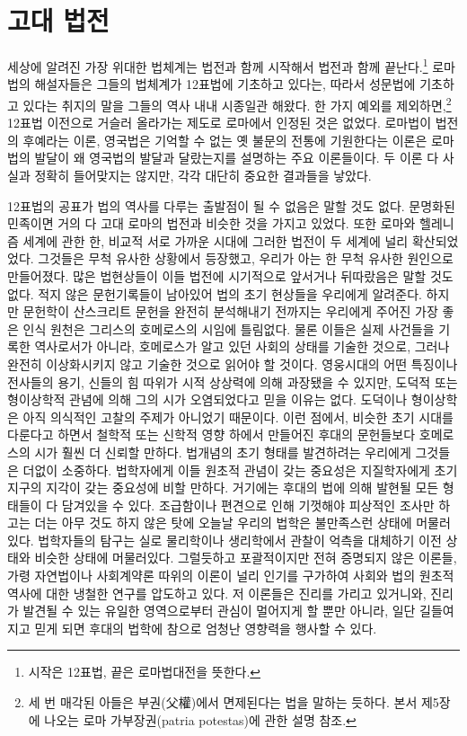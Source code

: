 
\chapter{고대 법전}

세상에 알려진 가장 위대한 법체계는 법전과 함께 시작해서
법전과 함께 끝난다.\footnote{시작은 12표법, 끝은 로마법대전을 뜻한다.}
로마법의 해설자들은 그들의 법체계가 12표법에 기초하고 있다는,
따라서 성문법에 기초하고 있다는 취지의 말을 그들의 역사 내내 시종일관 해왔다.
한 가지 예외를 제외하면,\footnote{세 번 매각된 아들은
부권(父權)에서 면제된다는 법을 말하는 듯하다.
본서 제5장에 나오는 로마 가부장권(patria potestas)에 관한 설명 참조.}
12표법 이전으로 거슬러 올라가는 제도로 로마에서 인정된 것은 없었다.
로마법이 법전의 후예라는 이론, 영국법은 기억할 수 없는
옛 불문의 전통에 기원한다는 이론은
로마법의 발달이 왜 영국법의 발달과 달랐는지를 설명하는 주요 이론들이다.
두 이론 다 사실과 정확히 들어맞지는 않지만, 각각 대단히 중요한 결과들을 낳았다.

12표법의 공표가 법의 역사를 다루는 출발점이 될 수 없음은 말할 것도 없다.
문명화된 민족이면 거의 다 고대 로마의 법전과 비슷한 것을 가지고 있었다.
또한 로마와 헬레니즘 세계에 관한 한, 비교적 서로 가까운 시대에
그러한 법전이 두 세계에 널리 확산되었었다.
그것들은 무척 유사한 상황에서 등장했고, 우리가 아는 한
무척 유사한 원인으로 만들어졌다.
많은 법현상들이 이들 법전에 시기적으로 앞서거나 뒤따랐음은 말할 것도 없다.
적지 않은 문헌기록들이 남아있어 법의 초기 현상들을 우리에게 알려준다.
하지만 문헌학이 산스크리트 문헌을 완전히 분석해내기 전까지는
우리에게 주어진 가장 좋은 인식 원천은 그리스의 호메로스의 시임에 틀림없다.
물론 이들은 실제 사건들을 기록한 역사로서가 아니라,
호메로스가 알고 있던 사회의 상태를 기술한 것으로,
그러나 완전히 이상화시키지 않고 기술한 것으로 읽어야 할 것이다.
영웅시대의 어떤 특징이나 전사들의 용기, 신들의 힘 따위가
시적 상상력에 의해 과장됐을 수 있지만, 도덕적 또는 형이상학적 관념에 의해
그의 시가 오염되었다고 믿을 이유는 없다.
도덕이나 형이상학은 아직 의식적인 고찰의 주제가 아니었기 때문이다.
이런 점에서, 비슷한 초기 시대를 다룬다고 하면서
철학적 또는 신학적 영향 하에서 만들어진 후대의 문헌들보다
호메로스의 시가 훨씬 더 신뢰할 만하다.
법개념의 초기 형태를 발견하려는 우리에게 그것들은 더없이 소중하다.
법학자에게 이들 원초적 관념이 갖는 중요성은
지질학자에게 초기 지구의 지각이 갖는 중요성에 비할 만하다.
거기에는 후대의 법에 의해 발현될 모든 형태들이 다 담겨있을 수 있다.
조급함이나 편견으로 인해 기껏해야 피상적인 조사만 하고는 더는
아무 것도 하지 않은 탓에 오늘날 우리의 법학은 불만족스런 상태에 머물러있다.
법학자들의 탐구는 실로 물리학이나 생리학에서 관찰이 억측을 대체하기 이전
상태와 비슷한 상태에 머물러있다.
그럴듯하고 포괄적이지만 전혀 증명되지 않은 이론들, 가령
자연법이나 사회계약론 따위의 이론이 널리 인기를 구가하여
사회와 법의 원초적 역사에 대한 냉철한 연구를 압도하고 있다.
저 이론들은 진리를 가리고 있거니와,
진리가 발견될 수 있는 유일한 영역으로부터 관심이 멀어지게 할 뿐만 아니라,
일단 길들여지고 믿게 되면 후대의 법학에 참으로 엄청난 영향력을
행사할 수 있다.

